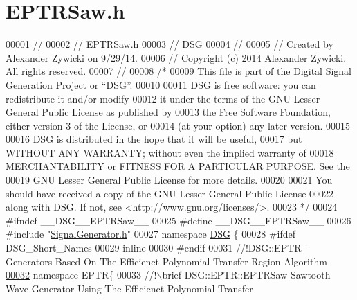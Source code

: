 \hypertarget{_e_p_t_r_saw_8h_source}{\section{E\+P\+T\+R\+Saw.\+h}
\label{_e_p_t_r_saw_8h_source}
}

\begin{DoxyCode}
00001 \textcolor{comment}{//}
00002 \textcolor{comment}{//  EPTRSaw.h}
00003 \textcolor{comment}{//  DSG}
00004 \textcolor{comment}{//}
00005 \textcolor{comment}{//  Created by Alexander Zywicki on 9/29/14.}
00006 \textcolor{comment}{//  Copyright (c) 2014 Alexander Zywicki. All rights reserved.}
00007 \textcolor{comment}{//}
00008 \textcolor{comment}{/*}
00009 \textcolor{comment}{ This file is part of the Digital Signal Generation Project or “DSG”.}
00010 \textcolor{comment}{}
00011 \textcolor{comment}{ DSG is free software: you can redistribute it and/or modify}
00012 \textcolor{comment}{ it under the terms of the GNU Lesser General Public License as published by}
00013 \textcolor{comment}{ the Free Software Foundation, either version 3 of the License, or}
00014 \textcolor{comment}{ (at your option) any later version.}
00015 \textcolor{comment}{}
00016 \textcolor{comment}{ DSG is distributed in the hope that it will be useful,}
00017 \textcolor{comment}{ but WITHOUT ANY WARRANTY; without even the implied warranty of}
00018 \textcolor{comment}{ MERCHANTABILITY or FITNESS FOR A PARTICULAR PURPOSE.  See the}
00019 \textcolor{comment}{ GNU Lesser General Public License for more details.}
00020 \textcolor{comment}{}
00021 \textcolor{comment}{ You should have received a copy of the GNU Lesser General Public License}
00022 \textcolor{comment}{ along with DSG.  If not, see <http://www.gnu.org/licenses/>.}
00023 \textcolor{comment}{ */}
00024 \textcolor{preprocessor}{#ifndef \_\_DSG\_\_EPTRSaw\_\_}
00025 \textcolor{preprocessor}{#define \_\_DSG\_\_EPTRSaw\_\_}
00026 \textcolor{preprocessor}{#include "\hyperlink{_signal_generator_8h}{SignalGenerator.h}"}
00027 \textcolor{keyword}{namespace }\hyperlink{namespace_d_s_g}{DSG} \{
00028 \textcolor{preprocessor}{#ifdef DSG\_Short\_Names}
00029     \textcolor{keyword}{inline}
00030 \textcolor{preprocessor}{#endif}
00031 \textcolor{comment}{    //!DSG::EPTR - Generators Based On The Efficienct Polynomial Transfer Region Algorithm}
\hypertarget{_e_p_t_r_saw_8h_source_l00032}{}\hyperlink{namespace_d_s_g_1_1_e_p_t_r}{00032} \textcolor{comment}{}    \textcolor{keyword}{namespace }EPTR\{\textcolor{comment}{}
00033 \textcolor{comment}{        //!\(\backslash\)brief DSG::EPTR::EPTRSaw-Sawtooth Wave Generator Using The Efficienct Polynomial Transfer
}
\end{DoxyCode}
